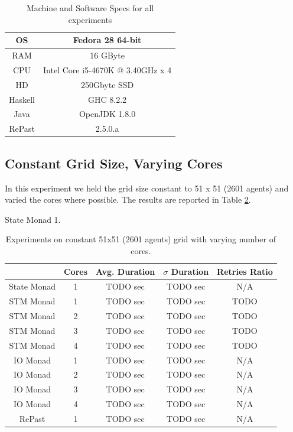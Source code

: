 \begin{table}
	\centering
	\begin{tabular}{ c || c }
		OS & Fedora 28 64-bit \\ \hline
		RAM & 16 GByte \\ \hline
		CPU & Intel Core i5-4670K @ 3.40GHz x 4 \\ \hline
		HD & 250Gbyte SSD \\ \hline
		Haskell & GHC 8.2.2 \\ \hline
		Java & OpenJDK 1.8.0 \\ \hline
		RePast & 2.5.0.a
	\end{tabular}
	
	\caption{Machine and Software Specs for all experiments}
	\label{tab:machine_specs}
\end{table}

\subsection{Constant Grid Size, Varying Cores}
In this experiment we held the grid size constant to 51 x 51 (2601 agents) and varied the cores where possible. The results are reported in Table \ref{tab:constgrid_varyingcores}.

State Monad
1.

\begin{table}
	\centering
  	\begin{tabular}{ c || c | c | c | c }
                	& Cores & Avg. Duration & $\sigma$ Duration & Retries Ratio \\ \hline \hline 
    	State Monad & 1     & TODO sec & TODO sec & N/A  \\ \hline \hline
   		STM Monad   & 1     & TODO sec & TODO sec & TODO \\ \hline
   		STM Monad   & 2     & TODO sec & TODO sec & TODO \\ \hline
   		STM Monad   & 3     & TODO sec & TODO sec & TODO \\ \hline
   		STM Monad   & 4     & TODO sec & TODO sec & TODO \\ \hline \hline
   		IO Monad    & 1     & TODO sec & TODO sec & N/A  \\ \hline 
   		IO Monad    & 2     & TODO sec & TODO sec & N/A  \\ \hline 
   		IO Monad    & 3     & TODO sec & TODO sec & N/A  \\ \hline 
   		IO Monad    & 4     & TODO sec & TODO sec & N/A  \\ \hline \hline
   		RePast      & 1     & TODO sec & TODO sec & N/A  \\ \hline 
  	\end{tabular}
  	
  	\caption{Experiments on constant 51x51 (2601 agents) grid with varying number of cores.}
	\label{tab:constgrid_varyingcores}
\end{table}

